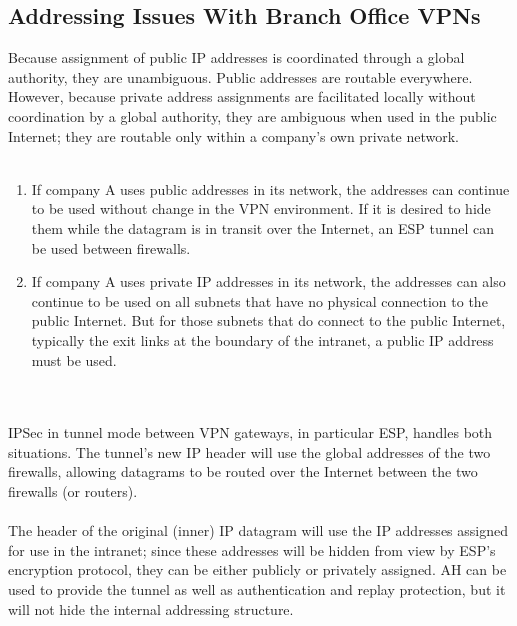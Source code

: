 \documentclass[10pt,a4paper]{article}
\begin{document}
\begin{itemize}
\begin{itemize}
\begin{itemize}
\subsection{Addressing Issues With Branch Office VPNs}
Because assignment of public IP addresses is coordinated through a global
authority, they are unambiguous. Public addresses are routable everywhere.
However, because private address assignments are facilitated locally without
coordination by a global authority, they are ambiguous when used in the public
Internet; they are routable only within a company's own private network.
\\
\\
\begin{enumerate}
\item If company A uses public addresses in its network, the addresses can
continue to be used without change in the VPN environment. If it is desired to
hide them while the datagram is in transit over the Internet, an ESP tunnel can
be used between firewalls.
\item If company A uses private IP addresses in its network, the addresses can also
continue to be used on all subnets that have no physical connection to the
public Internet. But for those subnets that do connect to the public Internet,
typically the exit links at the boundary of the intranet, a public IP address must
be used.
\end{enumerate}
\\
\\
IPSec in tunnel mode between VPN gateways, in particular ESP, handles both
situations. The tunnel's new IP header will use the global addresses of the two
firewalls, allowing datagrams to be routed over the Internet between the two
firewalls (or routers). 
\\
\\
The header of the original (inner) IP datagram will use the
IP addresses assigned for use in the intranet; since these addresses will be
hidden from view by ESP's encryption protocol, they can be either publicly or
privately assigned. AH can be used to provide the tunnel as well as
authentication and replay protection, but it will not hide the internal addressing
structure.





\end{itemize}
\end{itemize}
\end{itemize}
\end{document}
